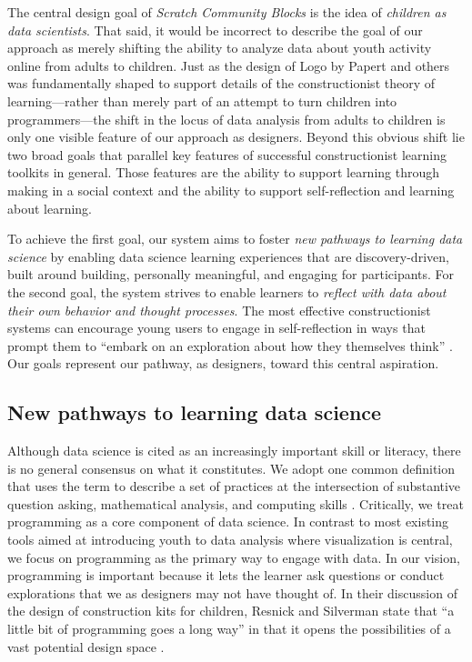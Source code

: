 \documentclass{sigchi}
\begin{document}
The central design goal of \emph{Scratch Community Blocks} is the idea of \emph{children as data scientists}. That said, it would be incorrect to describe the goal of our approach as merely shifting the ability to analyze data about youth activity online from adults to children. Just as the design of Logo by Papert and others \cite{papert_mindstorms:_1980, abelson_turtle_1986} was fundamentally shaped to support details of the constructionist theory of learning---rather than merely part of an attempt to turn children into programmers---the shift in the locus of data analysis from adults to children is only one visible feature of our approach as designers. Beyond this obvious shift lie two broad goals that parallel key features of successful constructionist learning toolkits in general. Those features are the ability to support learning through making in a social context and the ability to support self-reflection and learning about learning.

To achieve the first goal, our system aims to foster \emph{new pathways to learning data science} by enabling data science learning experiences that are discovery-driven, built around building, personally meaningful, and engaging for participants. For the second goal, the system strives to enable learners to \emph{reflect with data about their own behavior and thought processes}. The most effective constructionist systems can encourage young users to engage in self-reflection in ways that prompt them to ``embark on an exploration about how they themselves think'' \cite{papert_mindstorms:_1980}. Our goals represent our pathway, as designers, toward this central aspiration. 

\subsection{New pathways to learning data science}

Although data science is cited as an increasingly important skill or literacy, there is no general consensus on what it constitutes. We adopt one common definition that uses the term to describe a set of practices at the intersection of substantive question asking, mathematical analysis, and computing skills \cite{conway_data_2010, johnstone_data_2014}. Critically, we treat programming as a core component of data science. In contrast to most existing tools aimed at introducing youth to data analysis where visualization is central, we focus on programming as the primary way to engage with data. In our vision, programming is important because it lets the learner ask questions or conduct explorations that we as designers may not have thought of. In their discussion of the design of construction kits for children, Resnick and Silverman state that ``a little bit of programming goes a long way'' in that it opens the possibilities of a vast potential design space \cite{resnick_reflections_2005}.
\end{document}
